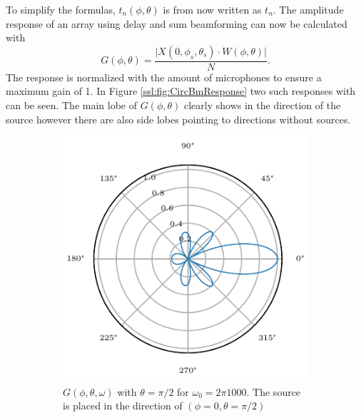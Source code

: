 To simplify the formulas, $t_n(\phi, \theta)$ is from now written as $t_n$.
The amplitude response of an array using delay and sum beamforming can
now be calculated with
\begin{equation}
	G(\phi, \theta) = 
	\frac{
		\lvert X(0, \phi_s, \theta_s) \cdot W(\phi, \theta) \rvert}
	{
		N
	}.
\end{equation}
The response is normalized with the amount of microphones to ensure a maximum
gain of 1.
In Figure \ref*{ssl:fig:CircBmResponse} two such responses with can be seen.
The main lobe of $G(\phi, \theta)$ clearly shows in the direction of the source
however there are also side lobes pointing to directions without sources.

\begin{figure}[h]
	\centering
	\begin{subfigure}[t]{0.45\textwidth}
		\centering
		\includegraphics[width=\textwidth]{radial_1200_circ_single.pdf}
		\caption{\(G(\phi, \theta, \omega)\) with $\theta = \pi/2$ for $\omega_0 = 2\pi 1000$.
		The source is placed in the direction of $(\phi=0, \theta = \pi/2)$}
		\label{ssl:fig:CircBmPhi}
	\end{subfigure}
	\hfill
	\begin{subfigure}[t]{0.45\textwidth}
		\centering

\end{subfigure}
\end{figure}
